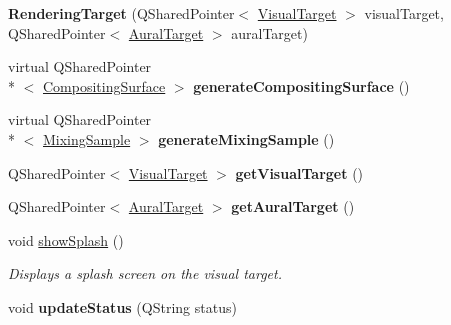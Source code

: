 \begin{DoxyCompactItemize}
\item 
\hypertarget{struct_picto_1_1_rendering_target_aea6f225e6d37cbfd3b9e34106c95cf8c}{{\bfseries Rendering\-Target} (Q\-Shared\-Pointer$<$ \hyperlink{class_picto_1_1_visual_target}{Visual\-Target} $>$ visual\-Target, Q\-Shared\-Pointer$<$ \hyperlink{class_picto_1_1_aural_target}{Aural\-Target} $>$ aural\-Target)}\label{struct_picto_1_1_rendering_target_aea6f225e6d37cbfd3b9e34106c95cf8c}

\item 
\hypertarget{struct_picto_1_1_rendering_target_a20e4997068b8846bd847bfbb1860c6ea}{virtual Q\-Shared\-Pointer\\*
$<$ \hyperlink{struct_picto_1_1_compositing_surface}{Compositing\-Surface} $>$ {\bfseries generate\-Compositing\-Surface} ()}\label{struct_picto_1_1_rendering_target_a20e4997068b8846bd847bfbb1860c6ea}

\item 
\hypertarget{struct_picto_1_1_rendering_target_a25047eda504be5db716e5486d6ad5715}{virtual Q\-Shared\-Pointer\\*
$<$ \hyperlink{class_picto_1_1_mixing_sample}{Mixing\-Sample} $>$ {\bfseries generate\-Mixing\-Sample} ()}\label{struct_picto_1_1_rendering_target_a25047eda504be5db716e5486d6ad5715}

\item 
\hypertarget{struct_picto_1_1_rendering_target_a2f654b53422001f892568ea23a9786e5}{Q\-Shared\-Pointer$<$ \hyperlink{class_picto_1_1_visual_target}{Visual\-Target} $>$ {\bfseries get\-Visual\-Target} ()}\label{struct_picto_1_1_rendering_target_a2f654b53422001f892568ea23a9786e5}

\item 
\hypertarget{struct_picto_1_1_rendering_target_a02bed34fb3f43df83536985b45d5236d}{Q\-Shared\-Pointer$<$ \hyperlink{class_picto_1_1_aural_target}{Aural\-Target} $>$ {\bfseries get\-Aural\-Target} ()}\label{struct_picto_1_1_rendering_target_a02bed34fb3f43df83536985b45d5236d}

\item 
void \hyperlink{struct_picto_1_1_rendering_target_aee17f76b4ff8218bbe2f1c1bc110f09a}{show\-Splash} ()
\begin{DoxyCompactList}\small\item\em Displays a splash screen on the visual target. \end{DoxyCompactList}\item 
\hypertarget{struct_picto_1_1_rendering_target_a7f31d8ccb70d83a56bf36668adfd38c7}{void {\bfseries update\-Status} (Q\-String status)}\label{struct_picto_1_1_rendering_target_a7f31d8ccb70d83a56bf36668adfd38c7}

\end{DoxyCompactItemize}


